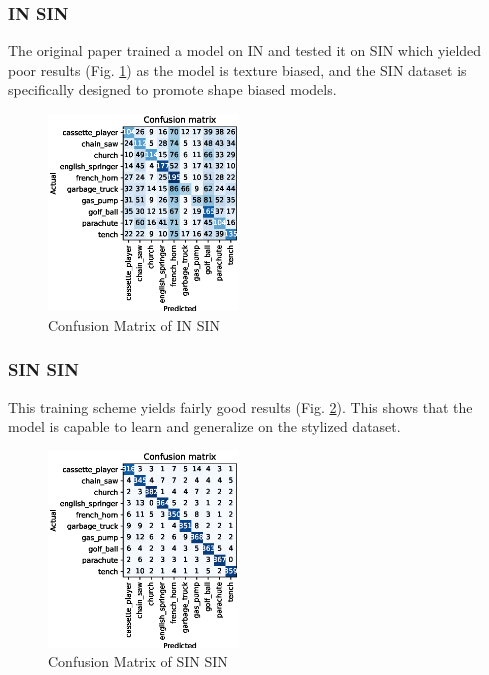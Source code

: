 \documentclass{article}
\begin{document}
\subsubsection{IN \texorpdfstring{\textrightarrow} .SIN}



The original paper trained a model on IN and tested it on SIN which yielded poor results (Fig. \ref{cm_in-sin}) as 
the model is texture biased, and the SIN dataset is specifically designed to promote shape biased models.

\begin{figure}[h!]
  \includegraphics[width = 0.45\textwidth]{imgs/in/in-sin/in-sin_confusion_matrix_0.313.eps}
  \caption{Confusion Matrix of IN \texorpdfstring{\textrightarrow} .SIN}
  \label{cm_in-sin}
\end{figure}

\subsubsection{SIN \texorpdfstring{\textrightarrow} .SIN}
This training scheme yields fairly good results (Fig. \ref{cm_sin-sin}). This shows that the model is capable to learn
and generalize on the stylized dataset.

\begin{figure}[h!]
  \includegraphics[width = 0.45\textwidth]{imgs/sin/sin-sin/sin-sin_confusion_matrix_0.908.eps}
  \caption{Confusion Matrix of SIN \texorpdfstring{\textrightarrow} .SIN}
  \label{cm_sin-sin}
\end{figure}
\end{document}
